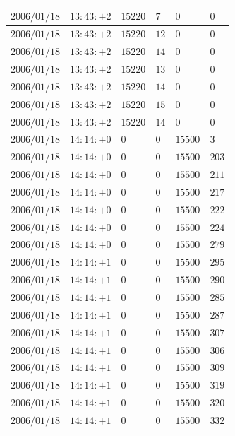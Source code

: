 \documentclass[a4j,papersize,disablejfam,slide,14pt]{jsarticle}
\begin{document}
\begin{description}
\begin{center}
\begin{longtable}{|l|l|l|l|l|l|}
					$2006/01/18$ & $13:43:+2$  & $15220$ & $7$ & $0$ & $0$ \\ \hline
					$2006/01/18$ & $13:43:+2$  & $15220$ & $12$ & $0$ & $0$ \\ \hline
					$2006/01/18$ & $13:43:+2$  & $15220$ & $14$ & $0$ & $0$ \\ \hline
					$2006/01/18$ & $13:43:+2$  & $15220$ & $13$ & $0$ & $0$ \\ \hline
					$2006/01/18$ & $13:43:+2$  & $15220$ & $14$ & $0$ & $0$ \\ \hline
					$2006/01/18$ & $13:43:+2$  & $15220$ & $15$ & $0$ & $0$ \\ \hline
					$2006/01/18$ & $13:43:+2$  & $15220$ & $14$ & $0$ & $0$ \\ \hline
					$2006/01/18$ & $14:14:+0$  & $0$ & $0$ & $15500$ & $3$ \\ \hline
					$2006/01/18$ & $14:14:+0$  & $0$ & $0$ & $15500$ & $203$ \\ \hline
					$2006/01/18$ & $14:14:+0$  & $0$ & $0$ & $15500$ & $211$ \\ \hline
					$2006/01/18$ & $14:14:+0$  & $0$ & $0$ & $15500$ & $217$ \\ \hline
					$2006/01/18$ & $14:14:+0$  & $0$ & $0$ & $15500$ & $222$ \\ \hline
					$2006/01/18$ & $14:14:+0$  & $0$ & $0$ & $15500$ & $224$ \\ \hline
					$2006/01/18$ & $14:14:+0$  & $0$ & $0$ & $15500$ & $279$ \\ \hline
					$2006/01/18$ & $14:14:+1$  & $0$ & $0$ & $15500$ & $295$ \\ \hline
					$2006/01/18$ & $14:14:+1$  & $0$ & $0$ & $15500$ & $290$ \\ \hline
					$2006/01/18$ & $14:14:+1$  & $0$ & $0$ & $15500$ & $285$ \\ \hline
					$2006/01/18$ & $14:14:+1$  & $0$ & $0$ & $15500$ & $287$ \\ \hline
					$2006/01/18$ & $14:14:+1$  & $0$ & $0$ & $15500$ & $307$ \\ \hline
					$2006/01/18$ & $14:14:+1$  & $0$ & $0$ & $15500$ & $306$ \\ \hline
					$2006/01/18$ & $14:14:+1$  & $0$ & $0$ & $15500$ & $309$ \\ \hline
					$2006/01/18$ & $14:14:+1$  & $0$ & $0$ & $15500$ & $319$ \\ \hline
					$2006/01/18$ & $14:14:+1$  & $0$ & $0$ & $15500$ & $320$ \\ \hline
					$2006/01/18$ & $14:14:+1$  & $0$ & $0$ & $15500$ & $332$ \\ \hline

\end{longtable}
\end{center}
\end{description}
\end{document}
